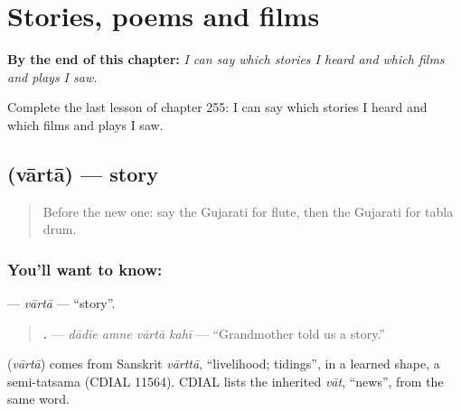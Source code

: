 
\chapter{Stories, poems and films}
\label{ch:gu-stories-poems-and-films}

\begin{chapteropening}
\textbf{By the end of this chapter:} \emph{I can say which stories I heard and which films and plays I saw.}

Complete the last lesson of chapter 255: I can say which stories I heard and which films and plays I saw.
\end{chapteropening}

\section[\texorpdfstring{\gu{વાર્તા} (vārtā)}{વાર્તા (vārtā)}]{ (vārtā) — story}

\label{lesson:GU-C255-varta}



\begin{quote}
Before the new one: say the Gujarati for flute, then the Gujarati for tabla drum.
\end{quote}

\subsection*{You'll want to know: }
\textbf{} — \emph{vārtā} — \textquotedblleft{}story\textquotedblright{}.

\begin{quote}
\textbf{   .} — \emph{dādīe amne vārtā kahī} — \textquotedblleft{}Grandmother told us a story.\textquotedblright{}
\end{quote}

\begin{cousinweb}
\textbf{} (\emph{vārtā}) comes from Sanskrit \emph{vārttā}, \textquotedblleft{}livelihood; tidings\textquotedblright{}, in a learned shape, a semi-tatsama (CDIAL 11564). CDIAL lists the inherited \emph{vāt}, \textquotedblleft{}news\textquotedblright{}, from the same word.
\end{cousinweb}


